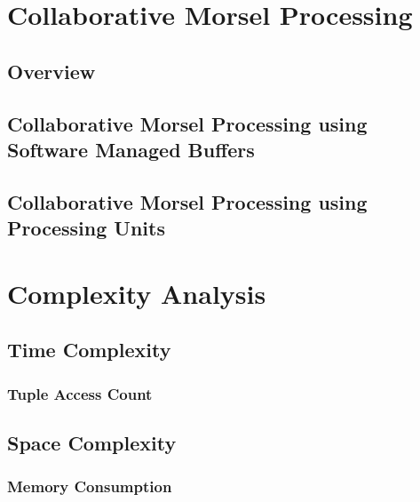 \section{Collaborative Morsel Processing}
\subsection{Overview}
\subsection{Collaborative Morsel Processing using Software Managed Buffers}
\subsection{Collaborative Morsel Processing using Processing Units}

\section{Complexity Analysis}
\subsection{Time Complexity}
\subsubsection{Tuple Access Count}
\subsection{Space Complexity}
\subsubsection{Memory Consumption}
